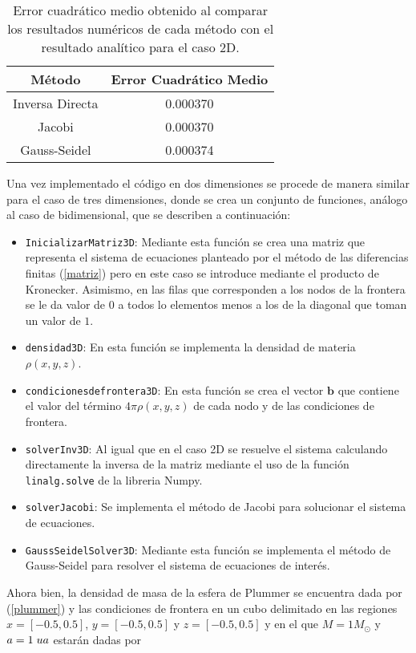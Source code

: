 \documentclass[reprint,amsmath,amssymb,aps]{revtex4-2}
\begin{document}
\begin{table}
    \centering
    \begin{tabular}{|c|c|} \hline
    \rowcolor[HTML]{EFEFEF}
         Método & Error Cuadrático Medio \\ \hline
         Inversa Directa &  0.000370 \\ \hline
         Jacobi & 0.000370\\ \hline
         Gauss-Seidel & 0.000374\\ \hline
    \end{tabular}
    \caption{Error cuadrático medio obtenido al comparar los resultados numéricos de cada método con el resultado analítico para el caso 2D.}
    \label{tab:1}
\end{table}
Una vez implementado el código en dos dimensiones se procede de manera similar para el caso de tres dimensiones, donde se crea un conjunto de funciones, análogo al caso de bidimensional, que se describen a continuación:
\begin{itemize}
    \item \texttt{InicializarMatriz3D}: Mediante esta función se crea una matriz que representa el sistema de ecuaciones planteado por el método de las diferencias finitas (\ref{matriz}) pero en este caso se introduce mediante el producto de Kronecker. Asimismo, en las filas que corresponden a los nodos de la frontera se le da valor de $0$ a todos lo elementos menos a los de la diagonal que toman un valor de $1$.
    \item \texttt{densidad3D}: En esta función se implementa la densidad de materia $\rho(x,y,z)$.
    \item \texttt{condicionesdefrontera3D}: En esta función se crea el vector $\textbf{b}$ que contiene el valor del término $4\pi \rho(x,y,z)$ de cada nodo y de las condiciones de frontera.
    \item \texttt{solverInv3D}: Al igual que en el caso 2D se resuelve el sistema calculando directamente la inversa de la matriz mediante el uso de la función \texttt{linalg.solve} de la libreria Numpy.
    \item \texttt{solverJacobi}: Se implementa el método de Jacobi para solucionar el sistema de ecuaciones.
    \item \texttt{GaussSeidelSolver3D}: Mediante esta función se implementa el método de Gauss-Seidel para resolver el sistema de ecuaciones de interés.
\end{itemize}
Ahora bien, la densidad de masa de la esfera de Plummer se encuentra dada por (\ref{plummer}) y las condiciones de frontera en un cubo delimitado en las regiones $x=[-0.5,0.5]$, $y=[-0.5,0.5]$ y $z=[-0.5,0.5]$ y en el que $M=1 M_{\odot}$ y $a=1 \hspace{0.1 cm} ua$ estarán dadas por
\end{document}
